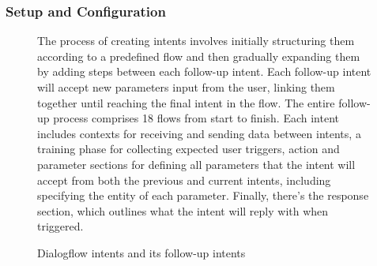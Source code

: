 \documentclass[12pt,oneside,openright,a4paper]{cpe-english-project}
\begin{document}
        \subsubsection{Setup and Configuration}
          \begin{figure}[H]
            \centering
            \caption{Dialogflow intents and its follow-up intents}\label{fig:dialogflow-intent}
            \begin{justify}
              \qquad The process of creating intents involves initially structuring them according to a predefined flow and then gradually expanding them by adding steps between each follow-up intent. Each follow-up intent will accept new parameters input from the user, linking them together until reaching the final intent in the flow. The entire follow-up process comprises 18 flows from start to finish. Each intent includes contexts for receiving and sending data between intents, a training phase for collecting expected user triggers, action and parameter sections for defining all parameters that the intent will accept from both the previous and current intents, including specifying the entity of each parameter. Finally, there's the response section, which outlines what the intent will reply with when triggered.\par
            \end{justify}        
          \end{figure}
\end{document}
